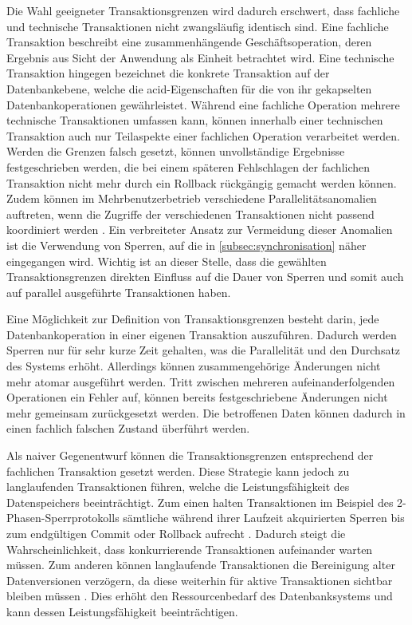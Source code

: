 Die Wahl geeigneter Transaktionsgrenzen wird dadurch erschwert, dass fachliche und technische Transaktionen nicht
zwangsläufig identisch sind.
Eine fachliche Transaktion beschreibt eine zusammenhängende Geschäftsoperation, deren Ergebnis aus Sicht der Anwendung als
Einheit betrachtet wird.
Eine technische Transaktion hingegen bezeichnet die konkrete Transaktion auf der Datenbankebene, welche die \gls{acid}-Eigenschaften
für die von ihr gekapselten Datenbankoperationen gewährleistet.
Während eine fachliche Operation mehrere technische Transaktionen umfassen kann, können innerhalb einer technischen Transaktion auch
nur Teilaspekte einer fachlichen Operation verarbeitet werden.
Werden die Grenzen falsch gesetzt, können unvollständige Ergebnisse festgeschrieben werden, die bei einem späteren Fehlschlagen
der fachlichen Transaktion nicht mehr durch ein Rollback rückgängig gemacht werden können.
Zudem können im Mehrbenutzerbetrieb verschiedene Parallelitätsanomalien auftreten, wenn die Zugriffe der verschiedenen
Transaktionen nicht passend koordiniert werden \parencite[Kap.~13.1.2]{saake_datenbanken_2018}.
Ein verbreiteter Ansatz zur Vermeidung dieser Anomalien ist die Verwendung von Sperren, auf die in \cref{subsec:synchronisation}
näher eingegangen wird.
Wichtig ist an dieser Stelle, dass die gewählten Transaktionsgrenzen direkten Einfluss auf die Dauer von Sperren und somit
auch auf parallel ausgeführte Transaktionen haben.

Eine Möglichkeit zur Definition von Transaktionsgrenzen besteht darin, jede Datenbankoperation in einer eigenen Transaktion auszuführen.
Dadurch werden Sperren nur für sehr kurze Zeit gehalten, was die Parallelität und den Durchsatz des Systems erhöht.
Allerdings können zusammengehörige Änderungen nicht mehr atomar ausgeführt werden.
Tritt zwischen mehreren aufeinanderfolgenden Operationen ein Fehler auf, können bereits festgeschriebene Änderungen nicht
mehr gemeinsam zurückgesetzt werden.
Die betroffenen Daten können dadurch in einen fachlich falschen Zustand überführt werden.

Als naiver Gegenentwurf können die Transaktionsgrenzen entsprechend der fachlichen Transaktion gesetzt werden.
Diese Strategie kann jedoch zu langlaufenden Transaktionen führen, welche die Leistungsfähigkeit des Datenspeichers beeinträchtigt.
Zum einen halten Transaktionen im Beispiel des 2-Phasen-Sperrprotokolls sämtliche während ihrer Laufzeit akquirierten Sperren
bis zum endgültigen Commit oder Rollback aufrecht \parencite[Kap.~7 Abschnitt \glqq Two-Phase Locking (2PL)\grqq]{kleppmann_designing_2017}.
Dadurch steigt die Wahrscheinlichkeit, dass konkurrierende Transaktionen aufeinander warten müssen.
Zum anderen können langlaufende Transaktionen die Bereinigung alter Datenversionen verzögern, da diese weiterhin für aktive
Transaktionen sichtbar bleiben müssen \parencite[Kap.~24.1.2]{the_postgresql_global_development_group_hrsg_postgresql_2026}.
Dies erhöht den Ressourcenbedarf des Datenbanksystems und kann dessen Leistungsfähigkeit beeinträchtigen.

